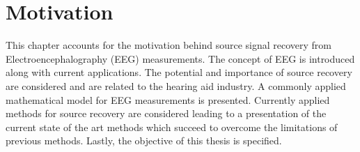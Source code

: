 \chapter{Motivation}\label{ch:motivation}
This chapter accounts for the motivation behind source signal recovery from Electroencephalography (EEG) measurements. The concept of EEG is introduced along with current applications. The potential and importance of source recovery are considered and are related to the hearing aid industry. A commonly applied mathematical model for EEG measurements is presented. Currently applied methods for source recovery are considered leading to a presentation of the current state of the art methods which succeed to overcome the limitations of previous methods. Lastly, the objective of this thesis is specified.          


